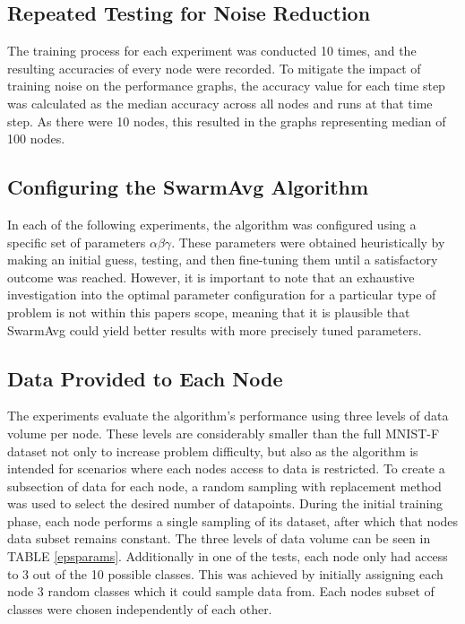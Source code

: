 \documentclass[letterpaper, 10 pt, conference]{ieeeconf}  %
\begin{document}
\subsection{Repeated Testing for Noise Reduction}
The training process for each experiment was conducted 10 times, and the resulting accuracies of every node were recorded. To mitigate the impact of training noise on the performance graphs, the accuracy value for each time step was calculated as the median accuracy across all nodes and runs at that time step. As there were 10 nodes, this resulted in the graphs representing median of 100 nodes.

\subsection{Configuring the SwarmAvg Algorithm}
In each of the following experiments, the algorithm was configured using a specific set of parameters $\alpha \beta \gamma$. These parameters were obtained heuristically by making an initial guess, testing, and then fine-tuning them until a satisfactory outcome was reached. However, it is important to note that an exhaustive investigation into the optimal parameter configuration for a particular type of problem is not within this papers scope, meaning that it is plausible that SwarmAvg could yield better results with more precisely tuned parameters.

\subsection{Data Provided to Each Node}
The experiments evaluate the algorithm's performance using three levels of data volume per node. These levels are considerably smaller than the full MNIST-F dataset not only to increase problem difficulty, but also as the algorithm is intended for scenarios where each nodes access to data is restricted. To create a subsection of data for each node, a random sampling with replacement method was used to select the desired number of datapoints. During the initial training phase, each node performs a single sampling of its dataset, after which that nodes data subset remains constant. The three levels of data volume can be seen in TABLE \ref{epsparams}. Additionally in one of the tests, each node only had access to 3 out of the 10 possible classes. This was achieved by initially assigning each node 3 random classes which it could sample data from. Each nodes subset of classes were chosen independently of each other.
\end{document}
